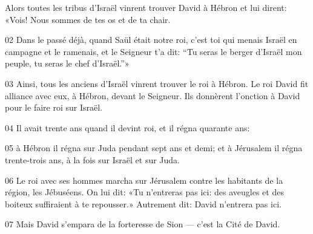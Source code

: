Alors toutes les tribus d’Israël vinrent trouver David à Hébron et lui dirent: «Vois! Nous sommes de tes os et de ta chair.

02 Dans le passé déjà, quand Saül était notre roi, c’est toi qui menais Israël en campagne et le ramenais, et le Seigneur t’a dit: “Tu seras le berger d’Israël mon peuple, tu seras le chef d’Israël.”»

03 Ainsi, tous les anciens d’Israël vinrent trouver le roi à Hébron. Le roi David fit alliance avec eux, à Hébron, devant le Seigneur. Ils donnèrent l’onction à David pour le faire roi sur Israël.

04 Il avait trente ans quand il devint roi, et il régna quarante ans:

05 à Hébron il régna sur Juda pendant sept ans et demi; et à Jérusalem il régna trente-trois ans, à la fois sur Israël et sur Juda.

06 Le roi avec ses hommes marcha sur Jérusalem contre les habitants de la région, les Jébuséens. On lui dit: «Tu n’entreras pas ici: des aveugles et des boiteux suffiraient à te repousser.» Autrement dit: David n’entrera pas ici.

07 Mais David s’empara de la forteresse de Sion --- c’est la Cité de David.